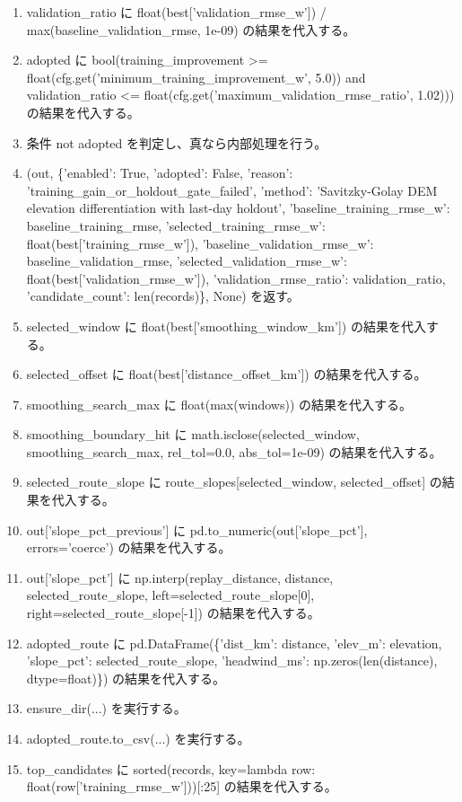 \documentclass[a4paper,11pt]{article}
\begin{document}
\begin{enumerate}[leftmargin=1.8em]
\item validation\_ratio に float(best['validation\_rmse\_w']) / max(baseline\_validation\_rmse, 1e-09) の結果を代入する。
\item adopted に bool(training\_improvement >= float(cfg.get('minimum\_training\_improvement\_w', 5.0)) and validation\_ratio <= float(cfg.get('maximum\_validation\_rmse\_ratio', 1.02))) の結果を代入する。
\item 条件 not adopted を判定し、真なら内部処理を行う。
\item   (out, \{'enabled': True, 'adopted': False, 'reason': 'training\_gain\_or\_holdout\_gate\_failed', 'method': 'Savitzky-Golay DEM elevation differentiation with last-day holdout', 'baseline\_training\_rmse\_w': baseline\_training\_rmse, 'selected\_training\_rmse\_w': float(best['training\_rmse\_w']), 'baseline\_validation\_rmse\_w': baseline\_validation\_rmse, 'selected\_validation\_rmse\_w': float(best['validation\_rmse\_w']), 'validation\_rmse\_ratio': validation\_ratio, 'candidate\_count': len(records)\}, None) を返す。
\item selected\_window に float(best['smoothing\_window\_km']) の結果を代入する。
\item selected\_offset に float(best['distance\_offset\_km']) の結果を代入する。
\item smoothing\_search\_max に float(max(windows)) の結果を代入する。
\item smoothing\_boundary\_hit に math.isclose(selected\_window, smoothing\_search\_max, rel\_tol=0.0, abs\_tol=1e-09) の結果を代入する。
\item selected\_route\_slope に route\_slopes[selected\_window, selected\_offset] の結果を代入する。
\item out['slope\_pct\_previous'] に pd.to\_numeric(out['slope\_pct'], errors='coerce') の結果を代入する。
\item out['slope\_pct'] に np.interp(replay\_distance, distance, selected\_route\_slope, left=selected\_route\_slope[0], right=selected\_route\_slope[-1]) の結果を代入する。
\item adopted\_route に pd.DataFrame(\{'dist\_km': distance, 'elev\_m': elevation, 'slope\_pct': selected\_route\_slope, 'headwind\_ms': np.zeros(len(distance), dtype=float)\}) の結果を代入する。
\item ensure\_dir(...) を実行する。
\item adopted\_route.to\_csv(...) を実行する。
\item top\_candidates に sorted(records, key=lambda row: float(row['training\_rmse\_w']))[:25] の結果を代入する。

\end{enumerate}
\end{document}
